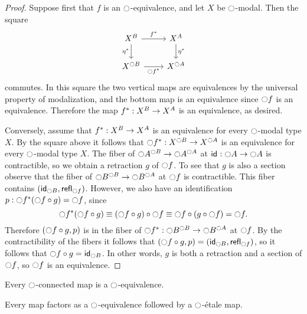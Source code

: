 \documentclass[9pt,twosided]{amsart}
\begin{document}
\begin{proof} 
Suppose first that $f$ is an $\modal$-equivalence, and let $X$ be $\modal$-modal. Then the square
\begin{equation*}
\begin{tikzcd}
X^B \arrow[r,"\precomp{f}"] \arrow[d,swap,"\precomp{\eta}"] & X^A \arrow[d,"\precomp{\eta}"] \\
X^{\modal B} \arrow[r,swap,"\precomp{\modal f}"] & X^{\modal A}
\end{tikzcd}
\end{equation*}
commutes. In this square the two vertical maps are equivalences by the universal property of modalization, and the bottom map is an equivalence since $\modal f$ is an equivalence. Therefore the map $\precomp{f}:X^B\to X^A$ is an equivalence, as desired.

Conversely, assume that $\precomp{f} : X^B \to X^A$ is an equivalence for every $\modal$-modal type $X$. By the square above it follows that $\precomp{\modal f}:X^{\modal B}\to X^{\modal A}$ is an equivalence for every $\modal$-modal type $X$. The fiber of $\modal A^{\modal B}\to \modal A^{\modal A}$ at $\idfunc:\modal A\to \modal A$ is contractible, so we obtain a retraction $g$ of $\modal f$. To see that $g$ is also a section observe that the fiber of $\modal B^{\modal B}\to \modal B^{\modal A}$ at $\modal f$ is contractible. This fiber contains $(\idfunc[\modal B],\refl{\modal f})$. However, we also have an identification $p:\precomp{\modal f}(\modal f\circ g)=\modal f$, since
\begin{equation*}
\precomp{\modal f}(\modal f\circ g)\jdeq (\modal f \circ g)\circ \modal f\jdeq \modal f \circ (g\circ \modal f) = \modal f. 
\end{equation*}
Therefore $(\modal f\circ g,p)$ is in the fiber of $\precomp{\modal f}:\modal B^{\modal B}\to \modal B^{\modal A}$ at $\modal f$. By the contractibility of the fibers it follows that $(\modal f\circ g,p)=(\idfunc[\modal B],\refl{\modal f})$, so it follows that $\modal f\circ g=\idfunc[\modal B]$. In other words, $g$ is both a retraction and a section of $\modal f$, so $\modal f$ is an equivalence.
\end{proof}

\begin{cor}\label{cor:mequiv_mconn}
Every $\modal$-connected map is a $\modal$-equivalence.
\end{cor}

\begin{lem}\label{lem:rfs_factor}
Every map factors as a $\modal$-equivalence followed by a $\modal$-\'etale map.
\end{lem}
\end{document}
